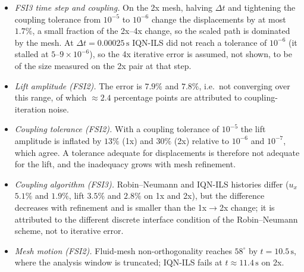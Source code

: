\begin{itemize}
	\item \emph{FSI3 time step and coupling.} On the 2x mesh, halving $\Delta t$ and tightening the coupling tolerance from $10^{-5}$ to $10^{-6}$ change the displacements by at most $1.7\%$, a small fraction of the 2x--4x change, so the scaled path is dominated by the mesh. At $\Delta t = 0.00025\,\mathrm{s}$ IQN-ILS did not reach a tolerance of $10^{-6}$ (it stalled at $5$--$9\times10^{-6}$), so the 4x iterative error is assumed, not shown, to be of the size measured on the 2x pair at that step.
	\item \emph{Lift amplitude (FSI2).} The error is $7.9\%$ and $7.8\%$, i.e.\ not converging over this range, of which $\approx2.4$ percentage points are attributed to coupling-iteration noise.
	\item \emph{Coupling tolerance (FSI2).} With a coupling tolerance of $10^{-5}$ the lift amplitude is inflated by $13\%$ (1x) and $30\%$ (2x) relative to $10^{-6}$ and $10^{-7}$, which agree. A tolerance adequate for displacements is therefore not adequate for the lift, and the inadequacy grows with mesh refinement.
	\item \emph{Coupling algorithm (FSI3).} Robin--Neumann and IQN-ILS histories differ ($u_x$ $5.1\%$ and $1.9\%$, lift $3.5\%$ and $2.8\%$ on 1x and 2x), but the difference decreases with refinement and is smaller than the 1x$\to$2x change; it is attributed to the different discrete interface condition of the Robin--Neumann scheme, not to iterative error.
	\item \emph{Mesh motion (FSI2).} Fluid-mesh non-orthogonality reaches $58^\circ$ by $t = 10.5\,\mathrm{s}$, where the analysis window is truncated; IQN-ILS fails at $t \approx 11.4\,\mathrm{s}$ on 2x.
\end{itemize}

